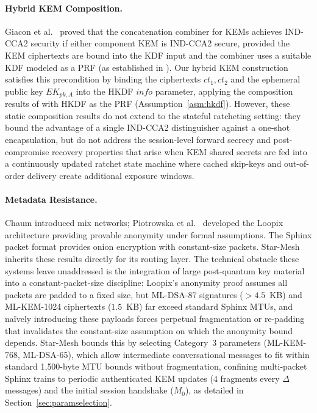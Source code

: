 \documentclass[11pt,a4paper]{article}
\theoremstyle{remark}
\theoremstyle{plain}
\begin{document}
\paragraph{Hybrid KEM Composition.}
Giacon et al.\ \cite{giacon2018kem} proved that the concatenation combiner for KEMs
achieves IND-CCA2 security if either component KEM is IND-CCA2 secure, provided the KEM ciphertexts are bound into the KDF input and the combiner
uses a suitable KDF modeled as a PRF (as established in \cite{giacon2018kem}).  Our
hybrid KEM construction satisfies this precondition by binding the ciphertexts $ct_1, ct_2$ and the ephemeral public key $EK_{pk,A}$ into the HKDF $info$ parameter, applying the composition results of \cite{giacon2018kem} with HKDF as
the PRF (Assumption~\ref{asm:hkdf}).
However, these static composition results do not extend to the stateful ratcheting setting:
they bound the advantage of a single IND-CCA2 distinguisher against a one-shot encapsulation,
but do not address the session-level forward secrecy and post-compromise recovery properties
that arise when KEM shared secrets are fed into a continuously updated ratchet state machine
where cached skip-keys and out-of-order delivery create additional exposure windows.

\paragraph{Metadata Resistance.}
Chaum \cite{chaum_mix} introduced mix networks; Piotrowska et al.\ \cite{loopix} developed the
Loopix architecture providing provable anonymity under formal assumptions.  The Sphinx packet
format \cite{sphinx} provides onion encryption with constant-size packets.  Star-Mesh inherits these results
directly for its routing layer.
The technical obstacle these systems leave unaddressed is the integration of large
post-quantum key material into a constant-packet-size discipline: Loopix's anonymity proof
assumes all packets are padded to a fixed size, but ML-DSA-87 signatures ($>4.5$~KB) and
ML-KEM-1024 ciphertexts ($1.5$~KB) far exceed standard Sphinx MTUs, and na\"ively introducing
these payloads forces perpetual fragmentation or re-padding that invalidates the constant-size assumption
on which the anonymity bound depends.  Star-Mesh bounds this by selecting Category~3
parameters (ML-KEM-768, ML-DSA-65), which allow intermediate conversational messages to fit within
standard 1{,}500-byte MTU bounds without fragmentation, confining multi-packet Sphinx trains to periodic
authenticated KEM updates (4 fragments every $\Delta$ messages) and the initial session handshake ($M_0$),
as detailed in Section~\ref{sec:paramselection}.
\end{document}
